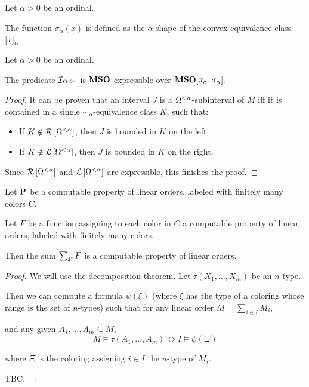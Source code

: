 \begin{definition}
  Let $\alpha > 0$ be an ordinal.

  The function $\sigma_{\alpha}(x)$ is defined as the $\alpha$-shape of
  the convex equivalence class $\left[ {x} \right]_{\alpha}$.
\end{definition}

\begin{lemma}
  Let $\alpha > 0$ be an ordinal.

  The predicate $\mathcal{I}_{\Omega^{< \alpha}}$ is $\mathbf{MSO}$-expressible over
  $\mathbf{MSO}[\pi_{\alpha}, \sigma_{\alpha}]$.
\end{lemma}

\begin{proof}
  It can be proven that an interval $J$ is a $\Omega^{< \alpha}$-subinterval of $M$ iff
  it is contained in a single $\sim_{\alpha}$-equivalence class $K$, such that:
  \begin{itemize}
    \item If $K \notin \mathcal{R} \left[ {{\Omega^{< \alpha}}} \right]$, then $J$ is bounded in $K$ on the left.
    \item If $K \notin \mathcal{L} \left[ {{\Omega^{< \alpha}}} \right]$, then $J$ is bounded in $K$ on the right.
  \end{itemize}

  Since $\mathcal{R} \left[ {{\Omega^{< \alpha}}} \right]$ and $\mathcal{L} \left[ {{\Omega^{< \alpha}}} \right]$ are expressible,
  this finishes the proof.
\end{proof}

\begin{theorem}\label{computable-sum}
  Let $\mathbf{P}$ be a computable property of linear orders,
  labeled with finitely many colors $C$.

  Let $F$ be a function assigning
  to each color in $C$ a computable
  property of linear orders, labeled with
  finitely many colors.

  Then the sum $\sum_{\mathbf{P}}{F}$ is a computable
  property of linear orders.
\end{theorem}

\begin{proof}
  We will use the decomposition theorem.
  Let $\tau(X_1, \ldots, X_m)$ be an $n$-type.

  Then we can compute a formula $\psi(\xi)$ (where
  $\xi$ has the type of a coloring whose range is
  the set of $n$-types) such that
  for any linear order $M = \sum_{i \in I} M_i$,

  and any given $A_1, \ldots, A_m \subseteq M$,
  \[
    M \models \tau(A_1, \ldots, A_m)
    \iff I \models \psi(\Xi)
  \]

  where $\Xi$ is the coloring assigning $i \in I$ the $n$-type of $M_i$.

  TBC.
\end{proof}

